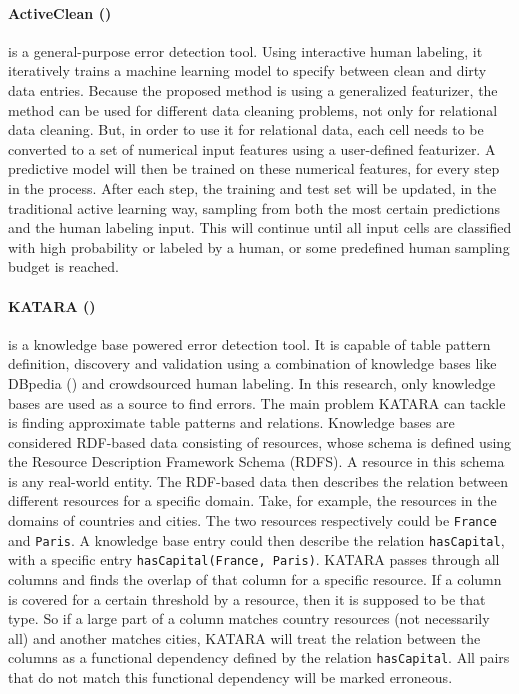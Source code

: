 
\paragraph{ActiveClean (\cite{Krishnan2016-va})} is a general-purpose error detection tool. Using interactive human labeling, it iteratively trains a machine learning model to specify between clean and dirty data entries. Because the proposed method is using a generalized featurizer, the method can be used for different data cleaning problems, not only for relational data cleaning. But, in order to use it for relational data, each cell needs to be converted to a set of numerical input features using a user-defined featurizer. A predictive model will then be trained on these numerical features, for every step in the process. After each step, the training and test set will be updated, in the traditional active learning way, sampling from both the most certain predictions and the human labeling input. This will continue until all input cells are classified with high probability or labeled by a human, or some predefined human sampling budget is reached.

\paragraph{KATARA (\cite{Chu2015-fs})} is a knowledge base powered error detection tool. It is capable of table pattern definition, discovery and validation using a combination of knowledge bases like DBpedia (\cite{Auer2007-ie}) and crowdsourced human labeling. In this research, only knowledge bases are used as a source to find errors. The main problem KATARA can tackle is finding approximate table patterns and relations. Knowledge bases are considered RDF-based data consisting of resources, whose schema is defined using the Resource Description Framework Schema (RDFS). A resource in this schema is any real-world entity. The RDF-based data then describes the relation between different resources for a specific domain. Take, for example, the resources in the domains of countries and cities. The two resources respectively could be \verb|France| and \verb|Paris|. A knowledge base entry could then describe the relation \verb|hasCapital|, with a specific entry \verb|hasCapital(France, Paris)|. KATARA passes through all columns and finds the overlap of that column for a specific resource. If a column is covered for a certain threshold by a resource, then it is supposed to be that type. So if a large part of a column matches country resources (not necessarily all) and another matches cities, KATARA will treat the relation between the columns as a functional dependency defined by the relation \verb|hasCapital|. All pairs that do not match this functional dependency will be marked erroneous. 

